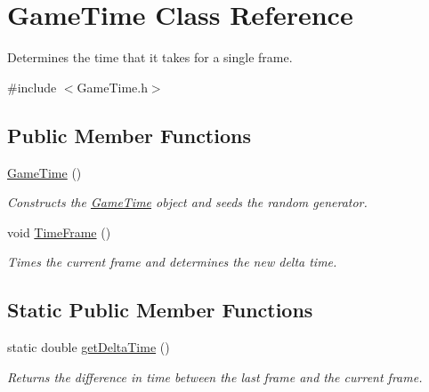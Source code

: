 \hypertarget{class_game_time}{}\section{Game\+Time Class Reference}
\label{class_game_time}


Determines the time that it takes for a single frame.  




{\ttfamily \#include $<$Game\+Time.\+h$>$}

\subsection*{Public Member Functions}
\begin{DoxyCompactItemize}
\item 
\mbox{\label{class_game_time_ab3b7fbfbc2a94e223d349b3dd48f76d3}} 
\hyperlink{class_game_time_ab3b7fbfbc2a94e223d349b3dd48f76d3}{Game\+Time} ()
\begin{DoxyCompactList}\small\item\em Constructs the \hyperlink{class_game_time}{Game\+Time} object and seeds the random generator. \end{DoxyCompactList}\item 
\mbox{\label{class_game_time_a424d4e2f4745a85897620751ff5153b9}} 
void \hyperlink{class_game_time_a424d4e2f4745a85897620751ff5153b9}{Time\+Frame} ()
\begin{DoxyCompactList}\small\item\em Times the current frame and determines the new delta time. \end{DoxyCompactList}\end{DoxyCompactItemize}
\subsection*{Static Public Member Functions}
\begin{DoxyCompactItemize}
\item 
static double \hyperlink{class_game_time_aa5ea84c887116ef68d1331617c5a81c3}{get\+Delta\+Time} ()
\begin{DoxyCompactList}\small\item\em Returns the difference in time between the last frame and the current frame. \end{DoxyCompactList}\end{DoxyCompactItemize}
